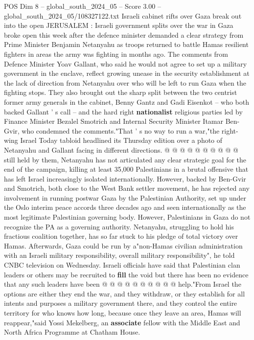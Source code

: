 \begin{textsample}{POS Dim 8 – global\_south\_2024\_05 – Score 3.00 – global\_south\_2024\_05/108327122.txt}  \label{ex:f8_pos_350}
Israeli cabinet rifts over Gaza break out into the open JERUSALEM : Israeli government splits over the war in Gaza broke open this week after the defence minister demanded a clear strategy from Prime Minister Benjamin Netanyahu as troops returned to battle Hamas resilient fighters in areas the army was fighting in months ago.
The comments from Defence Minister Yoav Gallant, who said he would not agree to set up a military government in the enclave, reflect growing unease in the security establishment at the lack of direction from Netanyahu over who will be left to run Gaza when the fighting stops.
They also brought out the sharp split between the two centrist former army generals in the cabinet, Benny Gantz and Gadi Eisenkot -- who both backed Gallant ' s call -- and the hard right \textbf{nationalist} religious parties led by Finance Minister Bezalel Smotrich and Internal Security Minister Itamar Ben-Gvir, who condemned the comments."That ' s no way to run a war,"the right-wing Israel Today tabloid headlined its Thursday edition over a photo of Netanyahu and Gallant facing in different directions. @ @ @ @ @ @ @ @ @ @ still held by them, Netanyahu has not articulated any clear strategic goal for the end of the campaign, killing at least 35,000 Palestinians in a brutal offensive that has left Israel increasingly isolated internationally.
However, backed by Ben-Gvir and Smotrich, both close to the West Bank settler movement, he has rejected any involvement in running postwar Gaza by the Palestinian Authority, set up under the Oslo interim peace accords three decades ago and seen internationally as the most legitimate Palestinian governing body.
However, Palestinians in Gaza do not recognize the PA as a governing authority.
Netanyahu, struggling to hold his fractious coalition together, has so far stuck to his pledge of total victory over Hamas.
Afterwards, Gaza could be run by a"non-Hamas civilian administration with an Israeli military responsibility, overall military responsibility", he told CNBC television on Wednesday.
Israeli officials have said that Palestinian clan leaders or others may be recruited to \textbf{fill} the void but there has been no evidence that any such leaders have been @ @ @ @ @ @ @ @ @ @ help."From Israel the options are either they end the war, and they withdraw, or they establish for all intents and purposes a military government there, and they control the entire territory for who knows how long, because once they leave an area, Hamas will reappear,"said Yossi Mekelberg, an \textbf{associate} fellow with the Middle East and North Africa Programme at Chatham House.

\end{textsample}
